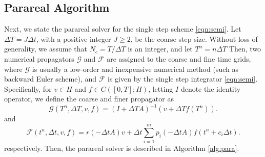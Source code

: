 \documentclass[a4paper, oneside]{book}
\def\G{{\mathcal{G}}}
\def\F{{\mathcal{F}}}
\begin{document}
\subsection{Parareal Algorithm}
Next, we state the parareal solver for the single step scheme \eqref{eqn:semi}.
Let $\Delta T=J \Delta t$, with a positive integer $J\ge2$, be the coarse step size.
Without loss of generality, we assume that $N_c = T/\Delta T$ is an integer, and let $T^n = n\Delta T$
Then, two numerical propagators $\G$ and $\F$ are assigned to the coarse and fine time grids,
where $\G$ is usually a low-order and inexpensive numerical method (such as backward Euler scheme), and $\F$
is given by the single step integrator \eqref{eqn:semi}. Specifically, for $v\in H$ and $f\in C([0,T];H)$, letting
$I$ denote the identity operator,
we define the coarse
and finer propagator as
\begin{equation*}
\G(T^n, \Delta T, v, f) = (I + \Delta T A)^{-1} (v + \Delta T f(T^n)).
\end{equation*}
and
\begin{equation*}
\F(t^n, \Delta t, v, f) =   r(-{\Delta t} A) v + {\Delta t} \sum_{i=1}^m p_i(-{\Delta t} A)  f(t^{n}+c_i\Delta t).
\end{equation*}
respectively. Then, the parareal solver is described in Algorithm \ref{alg:para}.




\end{document}
